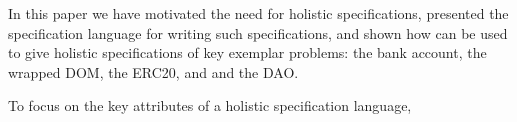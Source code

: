 In this paper we have motivated the need for holistic specifications,
presented the \Chainmail specification language for writing such
specifications, and shown 
how \Chainmail can be used to give holistic
specifications of key exemplar problems: the bank account,  the
wrapped DOM, the ERC20, and and the DAO.

To focus on the key attributes of a holistic specification language,



